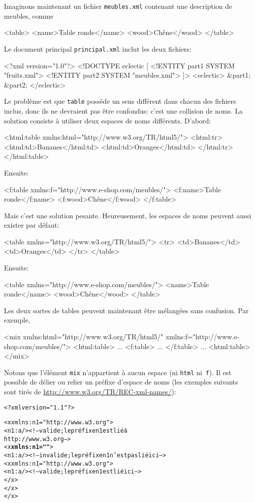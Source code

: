 Imaginons maintenant un fichier \texttt{meubles.xml} contenant une
description de meubles, comme
\begin{sverb}
<table>
  <name>Table ronde</name>
  <wood>Chêne</wood>
</table>
\end{sverb}
Le document principal \texttt{principal.xml} inclut les deux
fichiers:
\begin{sverb}
<?xml version="1.0"?>
<!DOCTYPE eclectic [
  <!ENTITY part1 SYSTEM "fruits.xml">
  <!ENTITY part2 SYSTEM "meubles.xml">
]>
<eclectic>
  &part1;
  &part2;
</eclectic>
\end{sverb}
Le problème est que \texttt{table} possède un sens différent dans
chacun des fichiers inclus, donc ils ne devraient pas être confondus:
c'est une collision de noms. La solution consiste à utiliser deux
espaces de noms différents. D'abord:
\begin{sverb}
<html:table xmlns:html="http://www.w3.org/TR/html5/">
  <html:tr>
    <html:td>Bananes</html:td>
    <html:td>Oranges</html:td>
  </html:tr>
</html:table>
\end{sverb}
Ensuite:
\begin{sverb}
<f:table xmlns:f="http://www.e-shop.com/meubles/">
  <f:name>Table ronde</f:name>
  <f:wood>Chêne</f:wood>
</f:table>
\end{sverb}
Mais c'est une solution pesante. Heureusement, les espaces de noms
peuvent aussi exister par défaut:
\begin{sverb}
<table xmlns="http://www.w3.org/TR/html5/">
  <tr>
    <td>Bananes</td>
    <td>Oranges</td>
  </tr>
</table>
\end{sverb}
Ensuite:
\begin{sverb}
<table xmlns="http://www.e-shop.com/meubles/">
  <name>Table ronde</name>
  <wood>Chêne</wood>
</table>
\end{sverb}
Les deux sortes de tables peuvent maintenant être mélangées sans
confusion. Par exemple,
\begin{sverb}
<mix xmlns:html="http://www.w3.org/TR/html5/"
     xmlns:f="http://www.e-shop.com/meubles/">
<html:table>
  ...
  <f:table>
  ...
  </f:table>
  ...
<html:table>
</mix>
\end{sverb}
Notons que l'élément \texttt{mix} n'appartient à aucun espace (ni
\texttt{html} ni~\texttt{f}). Il est possible de délier ou relier un
préfixe d'espace de noms (les exemples suivants sont tirés de
\url{http://www.w3.org/TR/REC-xml-names/}):
\begin{alltt}
\small<?xml version="1.1"?>

<x xmlns:n1="http://www.w3.org">
  <n1:a/> <!-- valide; le préfixe n1 est lié à
               http://www.w3.org -->
    <x \textbf{xmlns:n1=""}>
      <n1:a/> <!-- invalide; le préfixe n1 n'est pas lié ici -->
      <x xmlns:n1="http://www.w3.org">
        <n1:a/> <!-- valide; le préfixe n1 est lié ici -->
      </x>
   </x>
</x>
\end{alltt}

